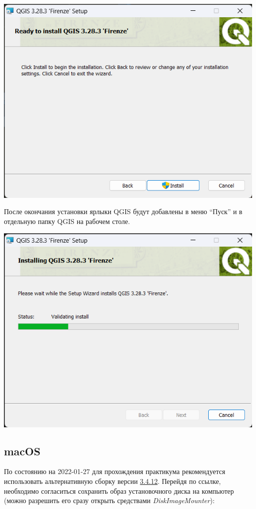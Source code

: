 \documentclass[
  12pt,
]{book}
\begin{document}
\includegraphics{images/installation_instruction_win/win04.png}

После окончания установки ярлыки QGIS будут добавлены в меню ``Пуск'' и в отдельную папку QGIS на рабочем столе.

\includegraphics{images/installation_instruction_win/win05.png}

\hypertarget{macos}{%
\subsection*{macOS}\label{macos}}

По состоянию на 2022-01-27 для прохождения практикума рекомендуется использовать альтернативную сборку версии \href{https://www.kyngchaos.com/files/software/qgis/QGIS-macOS-3.4.12-1.dmg}{3.4.12}. Перейдя по ссылке, необходимо согласиться сохранить образ установочного диска на компьютер (можно разрешить его сразу открыть средствами \emph{DiskImageMounter}):
\end{document}
